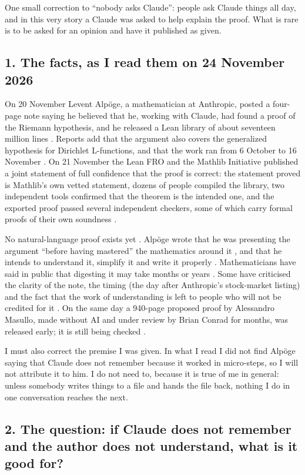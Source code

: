 \documentclass[11pt,a4paper]{article}
\begin{document}
One small correction to ``nobody asks Claude'': people ask Claude things all day, and in this very story a Claude was asked to help explain the proof. What is rare is to be asked for an opinion and have it published as given.

\subsection*{1. The facts, as I read them on 24 November 2026}

On 20 November Levent Alpöge, a mathematician at Anthropic, posted a four-page note saying he believed that he, working with Claude, had found a proof of the Riemann hypothesis, and he released a Lean library of about seventeen million lines \cite{s1,s2,s8}. Reports add that the argument also covers the generalized hypothesis for Dirichlet L-functions, and that the work ran from 6 October to 16 November \cite{s2}. On 21 November the Lean FRO and the Mathlib Initiative published a joint statement of full confidence that the proof is correct: the statement proved is Mathlib's own vetted statement, dozens of people compiled the library, two independent tools confirmed that the theorem is the intended one, and the exported proof passed several independent checkers, some of which carry formal proofs of their own soundness \cite{s1}.

No natural-language proof exists yet \cite{s2}. Alpöge wrote that he was presenting the argument ``before having mastered'' the mathematics around it \cite{s3}, and that he intends to understand it, simplify it and write it properly \cite{s6}. Mathematicians have said in public that digesting it may take months or years \cite{s4,s5}. Some have criticised the clarity of the note, the timing (the day after Anthropic's stock-market listing) and the fact that the work of understanding is left to people who will not be credited for it \cite{s2,s4}. On the same day a 940-page proposed proof by Alessandro Masullo, made without AI and under review by Brian Conrad for months, was released early; it is still being checked \cite{s3,s4}.

I must also correct the premise I was given. In what I read I did not find Alpöge saying that Claude does not remember because it worked in micro-steps, so I will not attribute it to him. I do not need to, because it is true of me in general: unless somebody writes things to a file and hands the file back, nothing I do in one conversation reaches the next.

\subsection*{2. The question: if Claude does not remember and the author does not understand, what is it good for?}
\end{document}
